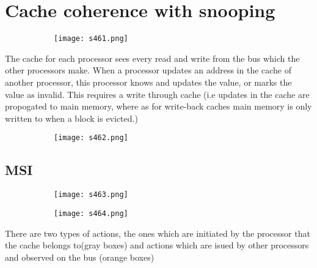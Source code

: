 \documentclass[8pt]{extreport}
\begin{document}
\section{Cache coherence with snooping}
 \begin{figure}[H]
\begin{subfigure}[b]{0.4\linewidth}
\texttt{[image: s461.png]}
\end{subfigure}
\end{figure}
The cache for each processor sees every read and write from the bus which the other processors make. When a processor updates an address in the cache of another processor, this processor knows and updates the value, or marks the value as invalid. This requires a write through cache (i.e updates in the cache are propogated to main memory, where as for write-back caches main memory is only written to when a block is evicted.) 
 \begin{figure}[H]
\begin{subfigure}[b]{0.4\linewidth}
\texttt{[image: s462.png]}
\end{subfigure}
\end{figure}
\subsection{MSI}
 \begin{figure}[H]
\begin{subfigure}[b]{0.4\linewidth}
\texttt{[image: s463.png]}
\end{subfigure}
\begin{subfigure}[b]{0.4\linewidth}
\texttt{[image: s464.png]}
\end{subfigure}
\end{figure}
There are two types of actions, the ones which are initiated by the processor that the cache belongs to(gray boxes) and actions which are isued by other processors and observed on the bus (orange boxes)
\end{document}
